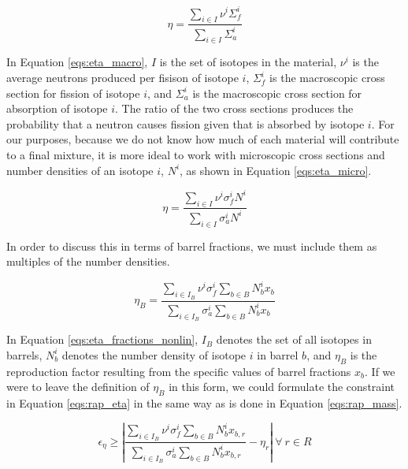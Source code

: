 \begin{equation}
\label{eqs:eta_macro}
\eta = \frac{\sum_{i \in I} \nu^{i} \Sigma_{f}^{i}}
            {\sum_{i \in I} \Sigma_{a}^{i}}
\end{equation}

In Equation \ref{eqs:eta_macro}, $I$ is the set of isotopes in the material,
$\nu^{i}$ is the average neutrons produced per fisison of isotope $i$,
$\Sigma_{f}^{i}$ is the macroscopic cross section for fission of isotope $i$,
and $\Sigma_{a}^{i}$ is the macroscopic cross section for absorption of isotope
$i$. The ratio of the two cross sections produces the probability that a neutron
causes fission given that is absorbed by isotope $i$. For our purposes, because
we do not know how much of each material will contribute to a final mixture, it
is more ideal to work with microscopic cross sections and number densities of an
isotope $i$, $N^{i}$, as shown in Equation \ref{eqs:eta_micro}.

\begin{equation}
\label{eqs:eta_micro}
\eta = \frac{\sum_{i \in I} \nu^{i} \sigma_{f}^{i} N^{i}}
            {\sum_{i \in I} \sigma_{a}^{i} N^{i}}
\end{equation}

In order to discuss this in terms of barrel fractions, we must include them as
multiples of the number densities. 

\begin{equation}
\label{eqs:eta_fractions_nonlin}
\eta_{B} = \frac{\sum_{i \in I_{B}} \nu^{i} \sigma_{f}^{i} \sum_{b \in B} N_{b}^{i} x_{b}}
                {\sum_{i \in I_{B}} \sigma_{a}^{i} \sum_{b \in B} N_{b}^{i} x_{b}}
\end{equation}

In Equation \ref{eqs:eta_fractions_nonlin}, $I_{B}$ denotes the set of all
isotopes in barrels, $N_{b}^{i}$ denotes the number density of isotope $i$ in
barrel $b$, and $\eta_{B}$ is the reproduction factor resulting from the
specific values of barrel fractions $x_{b}$. If we were to leave the definition
of $\eta_{B}$ in this form, we could formulate the constraint in
Equation \ref{eqs:rap_eta} in the same way as is done in
Equation \ref{eqs:rap_mass}.

\begin{equation}
\label{eqs:eta_nonlin}
\epsilon_{\eta} \geq \left| 
\frac{\sum_{i \in I_{B}} \nu^{i} \sigma_{f}^{i} \sum_{b \in B} N_{b}^{i} x_{b,r}}
     {\sum_{i \in I_{B}} \sigma_{a}^{i} \sum_{b \in B} N_{b}^{i} x_{b,r}} 
- \eta_{r} \right|
\: \forall \: r \in R
\end{equation}

